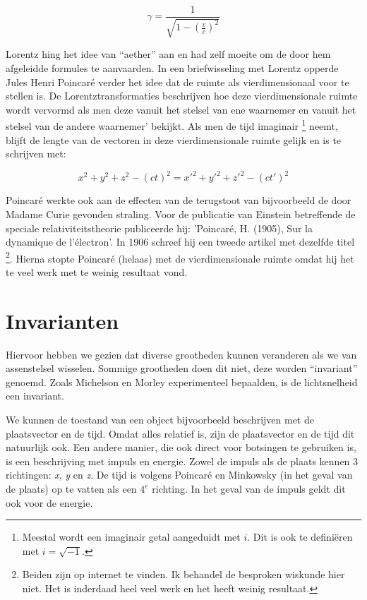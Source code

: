 \begin{equation}
\gamma=\frac{1}{\sqrt{1-\left(\frac{v}{c}\right)^{2}}}
\end{equation}


Lorentz hing het idee van ``aether'' aan en had zelf moeite om de door
hem afgeleidde formules te aanvaarden. In een briefwisseling met Lorentz
opperde Jules Henri Poincaré verder het idee dat de ruimte als
vierdimensionaal voor te stellen is. De Lorentztransformaties
beschrijven hoe deze vierdimensionale ruimte wordt vervormd als men deze
vanuit het stelsel van ene waarnemer en vanuit het stelsel van de andere
waarnemer' bekijkt. Als men de tijd imaginair \footnote{Meestal wordt
een imaginair getal aangeduidt met $i$. Dit is ook te definiëren met
$i=\sqrt{-1}$.} neemt, blijft de lengte van de vectoren in deze
vierdimensionale ruimte gelijk en is te schrijven met:

\begin{equation}
x^{2}+y^{2}+z^{2}-\left(ct\right)^{2}=x'^{2}+y'^{2}+z'^{2}-\left(ct'\right)^{2}
\end{equation}


Poincaré werkte ook aan de effecten van de terugstoot van bijvoorbeeld
de door Madame Curie gevonden straling. Voor de publicatie van Einstein
betreffende de speciale relativiteitstheorie publiceerde hij: 'Poincaré,
H. (1905), Sur la dynamique de l'électron'. In 1906 schreef hij een
tweede artikel met dezelfde titel \footnote{Beiden zijn op internet te
vinden. Ik behandel de besproken wiskunde hier niet. Het is inderdaad
heel veel werk en het heeft weinig resultaat.}. Hierna stopte Poincaré
(helaas) met de vierdimensionale ruimte omdat hij het te veel werk met
te weinig resultaat vond.


\section{\label{sec:Invarianten}Invarianten}

Hiervoor hebben we gezien dat diverse grootheden kunnen veranderen
als we van assenstelsel wisselen. Sommige grootheden doen dit niet,
deze worden ``invariant'' genoemd. Zoals Michelson en Morley experimenteel
bepaalden, is de lichtsnelheid een invariant.

We kunnen de toestand van een object bijvoorbeeld beschrijven met
de plaatsvector en de tijd. Omdat alles relatief is, zijn de plaatsvector
en de tijd dit natuurlijk ook. Een andere manier, die ook direct voor
botsingen te gebruiken is, is een beschrijving met impuls en energie.
Zowel de impuls als de plaats kennen 3 richtingen: \emph{x}, \emph{y}
en \emph{z}. De tijd is volgens Poincaré en Minkowsky (in het geval
van de plaats) op te vatten als een $4^{e}$ richting. In het geval
van de impuls geldt dit ook voor de energie.

